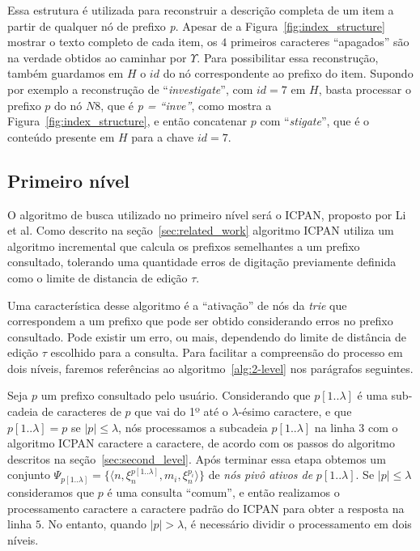 Essa estrutura é utilizada para reconstruir a descrição completa de um item a partir de qualquer nó de prefixo \textit{p}. Apesar de a Figura~\ref{fig:index_structure} mostrar o texto completo de cada item, os $4$ primeiros caracteres ``apagados'' são na verdade obtidos ao caminhar por $\Upsilon$. Para possibilitar essa reconstrução, também guardamos em $H$ o $id$ do nó correspondente ao prefixo do item. Supondo por exemplo a reconstrução de ``\textit{investigate}'', com $id=7$ em $H$, basta processar o prefixo $p$ do nó $N8$, que é \textit{p = ``inve''}, como mostra a Figura~\ref{fig:index_structure}, e então concatenar $p$ com ``\textit{stigate}'', que é o conteúdo presente em $H$ para a chave $id=7$.

\subsection{Primeiro nível}
\label{sec:first-level}

O algoritmo de busca utilizado no primeiro nível será o ICPAN, proposto por Li et al. Como descrito na seção~\ref{sec:related_work} algoritmo ICPAN utiliza um algoritmo incremental que calcula os prefixos semelhantes a um prefixo consultado, tolerando uma quantidade erros de digitação previamente definida como o limite de distancia de edição $\tau$.

Uma característica desse algoritmo é a ``ativação'' de nós da \textit{trie} que correspondem a um prefixo que pode ser obtido considerando erros no prefixo consultado. Pode existir um erro, ou mais, dependendo do limite de distância de edição $\tau$ escolhido para a consulta. Para facilitar a compreensão do processo em dois níveis, faremos referências ao algoritmo~\ref{alg:2-level} nos parágrafos seguintes.

Seja $p$ um prefixo consultado pelo usuário. Considerando que $p[1..\lambda]$ é uma sub-cadeia de caracteres de $p$ que vai do 1º até o $\lambda$-ésimo caractere, e que $p[1..\lambda] = p$ se $|p| \leq \lambda$, nós processamos a subcadeia $p[1..\lambda]$ na linha $3$ com o algoritmo ICPAN caractere a caractere, de acordo com os passos do algoritmo descritos na seção~\ref{sec:second_level}. Após terminar essa etapa obtemos um conjunto $\Psi_{p[1..\lambda]} = \{ \langle n, \xi_{n}^{p[1..\lambda]}, m_{i}, \xi_{n}^{p_{i}} \rangle \}$ de \textit{nós pivô ativos de} $p[1..\lambda]$. Se $|p| \leq \lambda$ consideramos que $p$ é uma consulta ``comum'', e então realizamos o processamento caractere a caractere padrão do ICPAN para obter a resposta na linha $5$. No entanto, quando $|p| > \lambda$, é necessário dividir o processamento em dois níveis.

